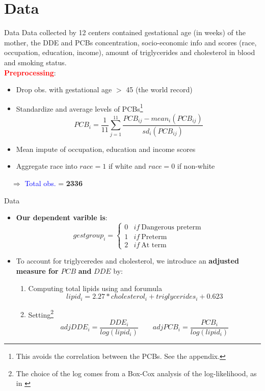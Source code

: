 \documentclass{beamer}\usepackage[]{graphicx}\usepackage[]{color}
\begin{document}
\section{Data}
\begin{frame}{Data}
Data collected by 12 centers contained gestational age (in weeks) of the mother, the DDE and PCBs concentration, socio-economic info and scores (race, occupation, education, income), amount of triglycerides and cholesterol in blood and smoking status. \\
\medskip 
\textcolor{red}{\textbf{Preprocessing}}:
\begin{itemize}
\item Drop obs. with gestational age $>$ 45 (the world record)
\item Standardize and average levels of PCBs\footnote{This avoids the correlation between the PCBs. See the appendix.}
$$PCB_i = \frac{1}{11}\sum_{j=1}^{11} \frac{PCB_{ij} - mean_i(PCB_{ij})}{sd_i(PCB_{ij})}$$
\item Mean impute of occupation, education and income scores 
\item Aggregate race into $race = 1$ if white and $race=0$ if non-white
\end{itemize}
$\quad \Longrightarrow$ \textcolor{blue}{Total obs.} = \textbf{2336}
\end{frame}
\begin{frame}{Data}
\small
\begin{itemize}
\item \textbf{Our dependent varible is}:
$$gestgroup_i = 
\begin{cases}
0 & if \ \textrm{Dangerous preterm} \\
1 & if \ \textrm{Preterm} \\
2 & if \ \textrm{At term} 
\end{cases}$$
\item To account for triglyceredes and cholesterol, we introduce an \textbf{adjusted measure for} $PCB$ \textbf{and} $DDE$ by:
\begin{enumerate}
\item Computing total lipids using \cite{Phillips1989} and \cite{Bernert2007} forumula $$lipid_i =  2.27 * cholesterol_i + triglycerides_i + 0.623$$ 
\item Setting\footnote{The choice of the log comes from a Box-Cox analysis of the log-likelihood, as in \cite{Li_Long_Duns}}
$$adjDDE_i = \frac{DDE_i}{log(lipid_i)} \qquad adjPCB_i = \frac{PCB_i}{log(lipid_i)}$$
\end{enumerate}
\end{itemize}
\end{frame}
\end{document}
